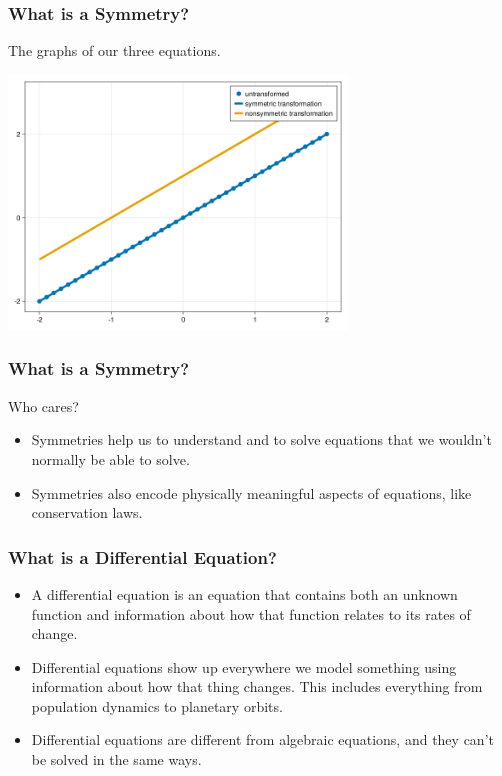 \documentclass{beamer}
\begin{document}
\begin{frame}
    \frametitle{What is a Symmetry?}
    The graphs of our three equations.\\
    \begin{center}
        \includegraphics[width=9cm]{y=x+1.png}
    \end{center}
\end{frame}



\begin{frame}
    \frametitle{What is a Symmetry?}
    \begin{Large}
        Who cares?
    \end{Large}
    \vspace*{0.25in}
    \begin{itemize}
        \item Symmetries help us to understand and to solve equations that we wouldn't normally be able to solve.\pause
        \item Symmetries also encode physically meaningful aspects of equations, like conservation laws.
    \end{itemize}
\end{frame}



\begin{frame}
    \frametitle{What is a Differential Equation?}
    \begin{definition}
    \begin{itemize}
        \item A differential equation is an equation that contains both an unknown function and information about how that function relates to its rates of change. \pause
        \item Differential equations show up everywhere we model something using information about how that thing changes. This includes everything from population dynamics to planetary orbits. \pause
        \item Differential equations are different from algebraic equations, and they can't be solved in the same ways.
    \end{itemize}
\end{definition}
\end{frame}
\end{document}
